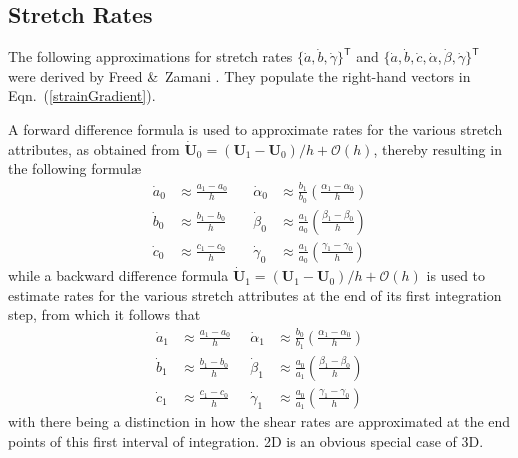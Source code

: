 \subsection{Stretch Rates}

The following approximations for stretch rates $\{ \dot{a} , \dot{b} , \dot{\gamma} \}^{\mathsf{T}}$ and $\{ \dot{a} , \dot{b} , \dot{c} , \dot{\alpha} , \dot{\beta} , \dot{\gamma} \}^{\mathsf{T}}$ were derived by Freed \&\ Zamani \cite{FreedZamani18}.  They populate the right-hand vectors in Eqn.~(\ref{strainGradient}).

A forward difference formula is used to approximate rates for the various stretch attributes, as obtained from $\dot{\boldsymbol{U}}_0 = ( \boldsymbol{U}_1 -  \boldsymbol{U}_0 ) / h + \mathcal{O}(h)$, thereby resulting in the following formul\ae\
\begin{equation}
\begin{aligned}
\dot{a}_0 &
\approx \frac {a_1 - a_0}{h} \quad &
\dot{\alpha}_0 & 
\approx \frac{b_1}{b_0} \left(\frac{\alpha_1 - \alpha_0}{h} \right) \\
\dot{b}_0 & 
\approx \frac {b_1 - b_0}{h} \quad & 
\dot{\beta}_0 & 
\approx \frac{a_1}{a_0} \left( \frac{\beta_1 - \beta_0}{h} \right) \\
\dot{c}_0 & 
\approx \frac {c_1 - c_0}{h} \quad & 
\dot{\gamma}_0 & \approx \frac{a_1}{a_0} \left( \frac{\gamma_1 - \gamma_0}{h}\right)
\end{aligned}
\label{forwardDifference1stOrder}
\end{equation}
while a backward difference formula $\dot{\boldsymbol{U}}_1 = ( \boldsymbol{U}_1 -  \boldsymbol{U}_0 ) / h + \mathcal{O}(h)$ is used to estimate rates for the various stretch attributes at the end of its first integration step, from which it follows that
\begin{equation}
\begin{aligned}
\dot{a}_1 & 
\approx \frac {a_1 - a_0}{h} \;\; & 
\dot{\alpha}_1 & 
\approx \frac {b_0}{b_1} \left( \frac{\alpha_1 - \alpha_0}{h} \right) \\
\dot{b}_1 & 
\approx \frac {b_1 - b_0}{h} \;\; & 
\dot{\beta}_1 & 
\approx \frac {a_0} {a_1} \left( \frac{\beta_1 - \beta_0}{h} \right) \\
\dot{c}_1 & 
\approx \frac {c_1 - c_0}{h} \;\; & 
\dot{\gamma}_1 & 
\approx \frac{a_0}{a_1} \left(\frac{\gamma_1 - \gamma_0}{h} \right)
\end{aligned}
\label{backwardDifference1stOrder}
\end{equation}
with there being a distinction in how the shear rates are approximated at the end points of this first interval of integration.  2D is an obvious special case of 3D.

